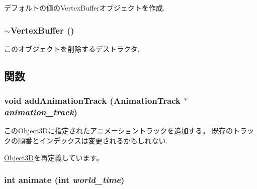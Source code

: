 デフォルトの値のVertexBufferオブジェクトを作成. \hypertarget{classm3g_1_1VertexBuffer_0e5e1dbdc4295ff9aa1e15e0ce3624af}{
\subsubsection[{$\sim$VertexBuffer}]{\setlength{\rightskip}{0pt plus 5cm}$\sim${\bf VertexBuffer} ()}}
\label{classm3g_1_1VertexBuffer_0e5e1dbdc4295ff9aa1e15e0ce3624af}


このオブジェクトを削除するデストラクタ. 

\subsection{関数}
\hypertarget{classm3g_1_1VertexBuffer_415c0b110f95410ded9b85e5d99a496b}{
\subsubsection[{addAnimationTrack}]{\setlength{\rightskip}{0pt plus 5cm}void addAnimationTrack ({\bf AnimationTrack} $\ast$ {\em animation\_\-track})}}
\label{classm3g_1_1VertexBuffer_415c0b110f95410ded9b85e5d99a496b}


このObject3Dに指定されたアニメーショントラックを追加する。 既存のトラックの順番とインデックスは変更されるかもしれない. 

\hyperlink{classm3g_1_1Object3D_415c0b110f95410ded9b85e5d99a496b}{Object3D}を再定義しています。\hypertarget{classm3g_1_1VertexBuffer_8aad1ceab4c2a03609c8a42324ce484d}{
\subsubsection[{animate}]{\setlength{\rightskip}{0pt plus 5cm}int animate (int {\em world\_\-time})}}
\label{classm3g_1_1VertexBuffer_8aad1ceab4c2a03609c8a42324ce484d}


